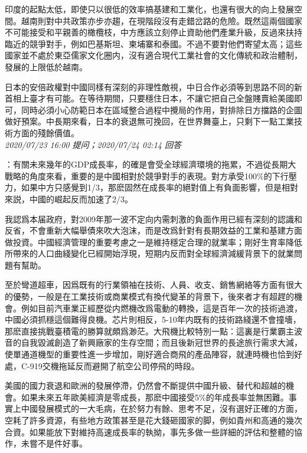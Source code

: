 \documentclass[twocolumn]{ctexart}
\begin{document}
印度的起點太低，即使只以很低的效率搞基建和工業化，也還有很大的向上發展空間。越南則對中共政策亦步亦趨，在現階段沒有走錯岔路的危險。既然這兩個國家不可能接受和平親善的橄欖枝，中方應該立刻停止資助他們產業升級，反過來扶持臨近的競爭對手，例如巴基斯坦、柬埔寨和泰國。不過不要對他們寄望太高；這些國家並不處於東亞儒家文化圈内，沒有適合現代工業社會的文化傳統和政治體制，發展的上限低於越南。

日本的安倍政權對中國同樣有深刻的非理性敵視，中日合作必須等到思路不同的新首相上臺才有可能。在等待期間，只要穩住日本，不讓它把自己全盤賤賣給美國即可，同時必須小心防範日本在區域整合過程中攪局的作用，對排除日方擋路的企圖做好預案。中長期來看，日本的衰退無可挽回，在世界舞臺上，只剩下一點工業技術方面的殘餘價值。
\\

\textit{\hfill\noindent\small 2020/07/23 16:00 提问；2020/07/24 02:14 回答}

：有關未來幾年的GDP成長率，的確是會受全球經濟環境的拖累，不過從長期大戰略的角度來看，重要的是中國相對於競爭對手的表現。對方承受100\%的下行壓力，如果中方只感覺到1/3，那麽固然在成長率的絕對值上有負面影響，但是相對來説，中國的崛起反而加速了2/3。

我認爲本届政府，對2009年那一波不定向内需刺激的負面作用已經有深刻的認識和反省，不會重新大幅舉債來吹大泡沫，而是改爲針對有長期效益的工業和基建方面做投資。中國經濟管理的重要考慮之一是維持穩定合理的就業率；剛好生育率降低所帶來的人口曲綫變化已經開始浮現，短期内反而對全球經濟減緩背景下的就業問題有幫助。

至於彎道超車，因爲既有的行業領袖在技術、人員、收支、銷售網絡等方面有很大的優勢，一般是在工業技術或商業模式有換代變革的背景下，後來者才有超趕的機會。例如目前汽車業正經歷從内燃機改爲電動的轉換，這是百年一次的技術過渡，中國必須抓穩這個難得良機。芯片則相反，5-10年内既有的技術路綫還不會撞墻，那麽直接挑戰臺積電的勝算就頗爲渺茫。大飛機比較特別一點：這裏是行業霸主波音的自我毀滅創造了新興廠家的生存空間；而且後新冠世界的長途旅行需求大減，使單通道機型的重要性進一步增加，剛好適合商飛的產品陣容，就連時機也恰到好處，C-919交機拖延反而避開了航空公司停飛的時段。

美國的國力衰退和歐洲的發展停滯，仍然會不斷提供中國升級、替代和超越的機會。如果未來五年歐美經濟是零成長，那麽中國接受5\%的年成長率並無困難。事實上中國發展模式的一大毛病，在於努力有餘、思考不足，沒有選好正確的方面，空耗了許多資源，有些地方政策甚至是花大錢砸國家的脚，例如貴州和高通的幾次合資。如果能放下對維持高速成長率的執拗，事先多做一些詳細的評估和整體的協作，未嘗不是件好事。
\\
\end{document}
